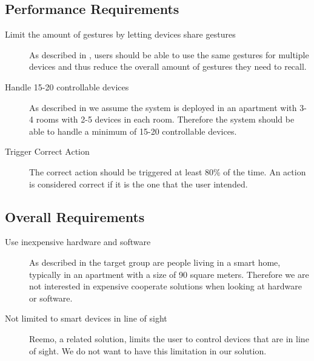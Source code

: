 \subsection{Performance Requirements}

\begin{description}
\item[Limit the amount of gestures by letting devices share gestures] As described in , users should be able to use the same gestures for multiple devices and thus reduce the overall amount of gestures they need to recall.
\item[Handle 15-20 controllable devices] As described in  we assume the system is deployed in an apartment with 3-4 rooms with 2-5 devices in each room. Therefore the system should be able to handle a minimum of 15-20 controllable devices.
\item[Trigger Correct Action] The correct action should be triggered at least 80\% of the time. An action is considered correct if it is the one that the user intended.
\end{description}

\subsection{Overall Requirements}

\begin{description}
\item[Use inexpensive hardware and software] As described in  the target group are people living in a smart home, typically in an apartment with a size of 90 square meters. Therefore we are not interested in expensive cooperate solutions when looking at hardware or software.
\item[Not limited to smart devices in line of sight] Reemo, a related solution, limits the user to control devices that are in line of sight. We do not want to have this limitation in our solution.
\end{description}

